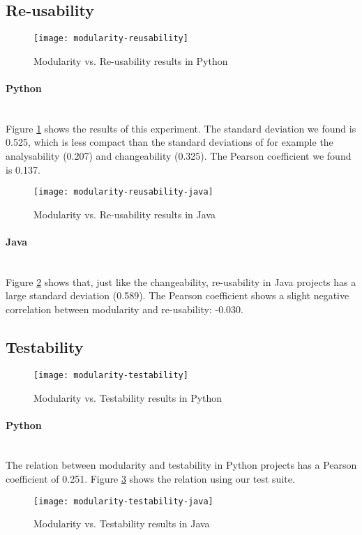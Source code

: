 \documentclass[twoside]{uva-inf-bachelor-thesis}
\newcommand{\myparagraph}[1]{\paragraph{#1}\mbox{}\\}
\begin{document}
\subsection{Re-usability}

\begin{figure}[H]
    \caption{Modularity vs. Re-usability results in Python}
    \label{figure:mod-reuse}
    \centering
        \texttt{[image: modularity-reusability]}
\end{figure}

\myparagraph{Python}
Figure \ref{figure:mod-reuse} shows the results of this experiment. The standard deviation we found is 0.525, which is less compact than the standard deviations of for example the analysability (0.207) and changeability (0.325). The Pearson coefficient we found is 0.137.

\begin{figure}[H]
    \caption{Modularity vs. Re-usability results in Java}
    \label{figure:mod-reuse-java}
    \centering
        \texttt{[image: modularity-reusability-java]}
\end{figure}

\myparagraph{Java}
Figure \ref{figure:mod-reuse-java} shows that, just like the changeability, re-usability in Java projects has a large standard deviation (0.589). The Pearson coefficient shows a slight negative correlation between modularity and re-usability: -0.030.

\subsection{Testability}

\begin{figure}[H]
    \caption{Modularity vs. Testability results in Python}
    \label{figure:mod-test}
    \centering
        \texttt{[image: modularity-testability]}
\end{figure}

\myparagraph{Python}
The relation between modularity and testability in Python projects has a Pearson coefficient of 0.251. Figure \ref{figure:mod-test} shows the relation using our test suite.

\begin{figure}[H]
    \caption{Modularity vs. Testability results in Java}
    \label{figure:mod-test-java}
    \centering
        \texttt{[image: modularity-testability-java]}
\end{figure}
\end{document}
